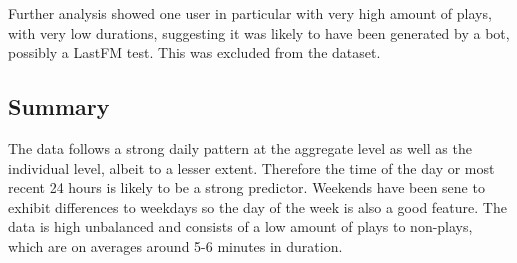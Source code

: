 \newpage

Further analysis showed one user in particular with very high amount of plays, with very low durations, suggesting it was likely to have been generated by a bot, possibly a LastFM test. This was excluded from the dataset.


\subsection{Summary}

The data follows a strong daily pattern at the aggregate level as well as the individual level, albeit to a lesser extent. Therefore the time of the day or most recent 24 hours is likely to be a strong predictor. Weekends have been sene to exhibit differences to weekdays so the day of the week is also a good feature. The data is high unbalanced and consists of a low amount of plays to non-plays, which are on averages around 5-6 minutes in duration.
